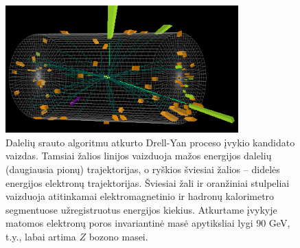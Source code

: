 \documentclass[a4paper, 12pt, oneside]{article}
\begin{document}
\begin{figure}[t]
	\includegraphics[width=0.8\textwidth]{Event.png}
	\caption{\label{fig:Event}
		Dalelių srauto algoritmu atkurto Drell-Yan proceso įvykio kandidato vaizdas.
		Tamsiai žalios linijos vaizduoja mažos energijos dalelių (daugiausia pionų) trajektorijas,
		o ryškios šviesiai žalios -- didelės energijos elektronų trajektorijas.
		Šviesiai žali ir oranžiniai stulpeliai vaizduoja atitinkamai elektromagnetinio ir hadronų kalorimetro
		segmentuose užregistruotus energijos kiekius.
		Atkurtame įvykyje matomos elektronų poros invariantinė masė apytiksliai lygi $90$ GeV, t.y., labai artima $Z$ bozono masei.
	}
\end{figure}
\end{document}
